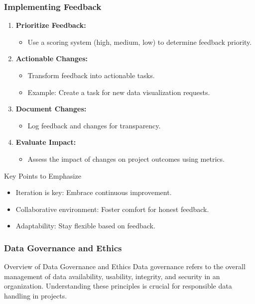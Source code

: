 \documentclass{beamer}
\begin{document}
\begin{frame}[fragile]
    \frametitle{Implementing Feedback}
    
    \begin{enumerate}
        \item \textbf{Prioritize Feedback:}
        \begin{itemize}
            \item Use a scoring system (high, medium, low) to determine feedback priority.
        \end{itemize}

        \item \textbf{Actionable Changes:}
        \begin{itemize}
            \item Transform feedback into actionable tasks.
            \item Example: Create a task for new data visualization requests.
        \end{itemize}

        \item \textbf{Document Changes:}
        \begin{itemize}
            \item Log feedback and changes for transparency.
        \end{itemize}

        \item \textbf{Evaluate Impact:}
        \begin{itemize}
            \item Assess the impact of changes on project outcomes using metrics.
        \end{itemize}
    \end{enumerate}
    
    \begin{block}{Key Points to Emphasize}
        \begin{itemize}
            \item Iteration is key: Embrace continuous improvement.
            \item Collaborative environment: Foster comfort for honest feedback.
            \item Adaptability: Stay flexible based on feedback.
        \end{itemize}
    \end{block}
\end{frame}

\begin{frame}[fragile]
    \frametitle{Data Governance and Ethics}
    \begin{block}{Overview of Data Governance and Ethics}
        Data governance refers to the overall management of data availability, usability, integrity, and security in an organization. Understanding these principles is crucial for responsible data handling in projects.
    \end{block}
\end{frame}
\end{document}
